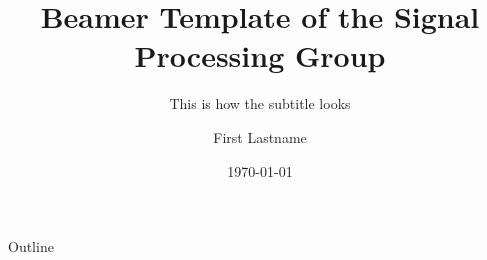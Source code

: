 \documentclass[10pt]{beamer}
\title[This is the short title]{Beamer Template of the Signal Processing Group}
\subtitle{This is how the subtitle looks}
\author[F. Lastname]{First Lastname}
\institute[Uni Hamburg]{Universität Hamburg\\ Signal Processing (SP)}
\date{\today}
\begin{document}
\begin{frame}[plain]
    \maketitle
\end{frame}

\begin{frame}{Outline}
    \tableofcontents
\end{frame}












\end{document}
